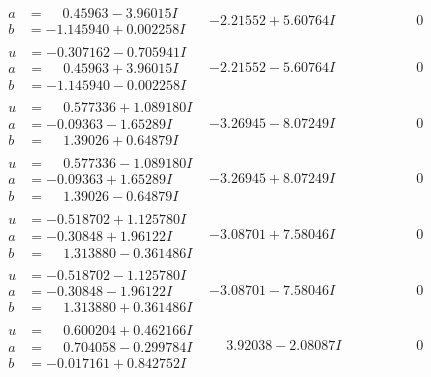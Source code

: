 \documentclass[1p]{elsarticle_modified}
\theoremstyle{definition}
\begin{document}
$$\begin{array}{c|c|c}
\begin{aligned}
a &= \phantom{-}0.45963 - 3.96015 I \\
b &= -1.145940 + 0.002258 I\end{aligned}
 & -2.21552 + 5.60764 I & \phantom{-0.000000 } 0 \\ \hline\begin{aligned}
u &= -0.307162 - 0.705941 I \\
a &= \phantom{-}0.45963 + 3.96015 I \\
b &= -1.145940 - 0.002258 I\end{aligned}
 & -2.21552 - 5.60764 I & \phantom{-0.000000 } 0 \\ \hline\begin{aligned}
u &= \phantom{-}0.577336 + 1.089180 I \\
a &= -0.09363 - 1.65289 I \\
b &= \phantom{-}1.39026 + 0.64879 I\end{aligned}
 & -3.26945 - 8.07249 I & \phantom{-0.000000 } 0 \\ \hline\begin{aligned}
u &= \phantom{-}0.577336 - 1.089180 I \\
a &= -0.09363 + 1.65289 I \\
b &= \phantom{-}1.39026 - 0.64879 I\end{aligned}
 & -3.26945 + 8.07249 I & \phantom{-0.000000 } 0 \\ \hline\begin{aligned}
u &= -0.518702 + 1.125780 I \\
a &= -0.30848 + 1.96122 I \\
b &= \phantom{-}1.313880 - 0.361486 I\end{aligned}
 & -3.08701 + 7.58046 I & \phantom{-0.000000 } 0 \\ \hline\begin{aligned}
u &= -0.518702 - 1.125780 I \\
a &= -0.30848 - 1.96122 I \\
b &= \phantom{-}1.313880 + 0.361486 I\end{aligned}
 & -3.08701 - 7.58046 I & \phantom{-0.000000 } 0 \\ \hline\begin{aligned}
u &= \phantom{-}0.600204 + 0.462166 I \\
a &= \phantom{-}0.704058 - 0.299784 I \\
b &= -0.017161 + 0.842752 I\end{aligned}
 & \phantom{-}3.92038 - 2.08087 I & \phantom{-0.000000 } 0 \\ \hline\begin{aligned}

\end{aligned}
\end{array}$$
\end{document}
